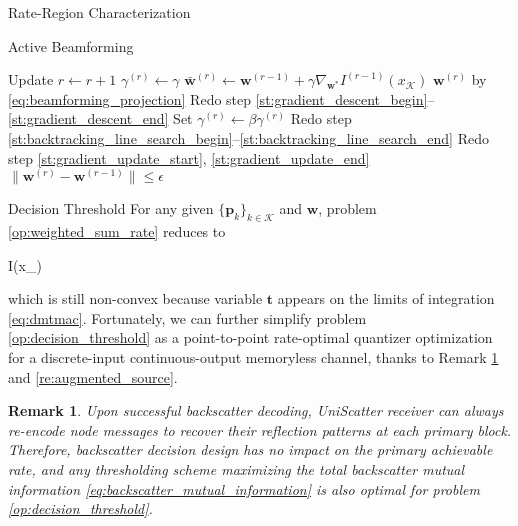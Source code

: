 \documentclass[journal]{IEEEtran}
\newtheorem{remark}{Remark}
\begin{document}
\begin{section}{Rate-Region Characterization}
\begin{subsection}{Active Beamforming}
\begin{algorithm}[!t]
\begin{algorithmic}[1]
				\Repeat
					\State Update $r \gets r+1$
					\State \phantom{Update} $\gamma^{(r)}\gets\gamma$
					\State \phantom{Update} $\bar{\boldsymbol{w}}^{(r)} \gets \boldsymbol{w}^{(r-1)}+\gamma\nabla_{\boldsymbol{w}^*} I^{(r-1)}(x_{\mathcal{K}})$ \label{st:backtracking_line_search_begin}
					\State \phantom{Update} $\boldsymbol{w}^{(r)}$ by \eqref{eq:beamforming_projection}
					\State Redo step \ref{st:gradient_descent_begin}--\ref{st:gradient_descent_end} \label{st:backtracking_line_search_end}
						\State Set $\gamma^{(r)}\gets\beta\gamma^{(r)}$
						\State Redo step \ref{st:backtracking_line_search_begin}--\ref{st:backtracking_line_search_end}
					\EndWhile
					\State Redo step \ref{st:gradient_update_start}, \ref{st:gradient_update_end}
				\Until $\lVert\boldsymbol{w}^{(r)}-\boldsymbol{w}^{(r-1)}\rVert \le \epsilon$
			\end{algorithmic}
		\end{algorithm}
	\end{subsection}

	\begin{subsection}{Decision Threshold}
		For any given $\{\boldsymbol{p}_k\}_{k \in \mathcal{K}}$ and $\boldsymbol{w}$, problem \eqref{op:weighted_sum_rate} reduces to
		\begin{maxi!}
			{}{I(x_{})}{\label{op:decision_threshold}}{\label{ob:decision_threshold}}
			\addConstraint{\eqref{co:sequential_threshold},\eqref{co:nonnegative_threshold},}
		\end{maxi!}
		which is still non-convex because variable $\boldsymbol{t}$ appears on the limits of integration \eqref{eq:dmtmac}.
		Fortunately, we can further simplify problem \eqref{op:decision_threshold} as a point-to-point rate-optimal quantizer optimization for a discrete-input continuous-output memoryless channel, thanks to Remark \ref{re:backscatter_decision} and \ref{re:augmented_source}.

		\begin{remark}
			Upon successful backscatter decoding, UniScatter receiver can always re-encode node messages to recover their reflection patterns at each primary block.
			Therefore, backscatter decision design has no impact on the primary achievable rate, and any thresholding scheme maximizing the total backscatter mutual information \eqref{eq:backscatter_mutual_information} is also optimal for problem \eqref{op:decision_threshold}.
			\label{re:backscatter_decision}
		\end{remark}


\end{subsection}
\end{section}
\end{document}
